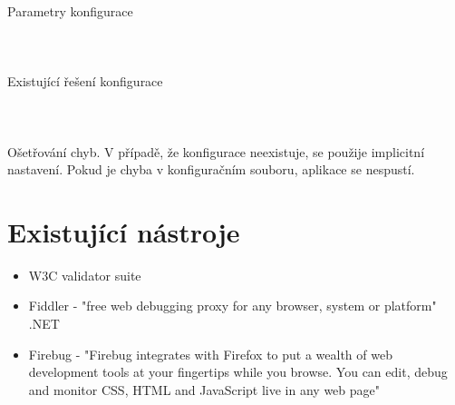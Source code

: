 \documentclass[10pt]{article}
\begin{document}
	\paragraph{~}Parametry konfigurace
	\paragraph{~}Existující řešení konfigurace
	\paragraph{~}Ošetřování chyb. V případě, že konfigurace neexistuje, se použije implicitní nastavení. Pokud je chyba v konfiguračním souboru, aplikace se nespustí.
\section{Existuj\'ic\'i n\'astroje}
\begin{itemize}
	\item W3C validator suite
	\item Fiddler - "free web debugging proxy for any browser, system or platform" .NET
	\item Firebug - "Firebug integrates with Firefox to put a wealth of web development tools at your fingertips while you browse. You can edit, debug and monitor CSS, HTML and JavaScript live in any web page"
\end{itemize}	
\end{document}
